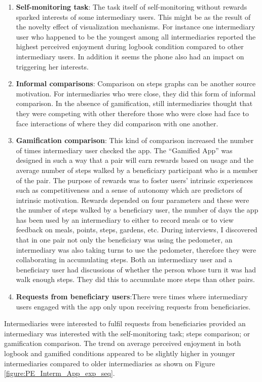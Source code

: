 \begin{enumerate}
\item{\textbf{Self-monitoring task}}: The task itself of self-monitoring without rewards sparked interests of some intermediary users. This might be as the result of the novelty effect of visualization mechanisms. For instance one intermediary user who happened to be the youngest among all intermediaries reported the highest perceived enjoyment during logbook condition compared to other intermediary users. In addition it seems the phone also had an impact on triggering her interests.
\item{\textbf{Informal comparisons}}: Comparison on steps graphs can be another source motivation. For intermediaries who were close, they did this form of informal comparison. In the absence of gamification, still intermediaries thought that they were competing with other therefore those who were close had face to face interactions of where they did comparison with one another. 
\item{\textbf{Gamification comparison}}: This kind of comparison increased the number of times intermediary user checked the app.
 The ``Gamified App'' was designed in such a way that a pair will earn rewards based on usage and the average number of steps walked by a beneficiary participant who is a member of the pair. The purpose of rewards was to foster users' intrinsic experiences such as competitiveness and a sense of autonomy which are predictors of intrinsic motivation. Rewards depended on four parameters and these were the number of steps walked by a beneficiary user, the number of days the app has been used by an intermediary to either to record meals or to view feedback on meals, points, steps, gardens, etc. During interviews, I discovered that in one pair not only the beneficiary was using the pedometer, an intermediary was also taking turns to use the pedometer, therefore they were collaborating in accumulating steps. Both an intermediary user and a beneficiary user had discussions of whether the person whose turn it was had walk enough steps. They did this to accumulate more steps than other pairs.
\item{\textbf{Requests from beneficiary users}}:There were times where intermediary users engaged with the app only upon receiving requests from beneficiaries. 
\end{enumerate} 
Intermediaries were interested to fulfil requests from beneficiaries provided an intermediary was interested with the self-monitoring task; steps comparison; or gamification comparison. The trend on average perceived enjoyment in both logbook and gamified conditions appeared to be slightly higher in younger intermediaries compared to older intermediaries as shown on Figure \ref{figure:PE_Interm_App_exp_seq}.

